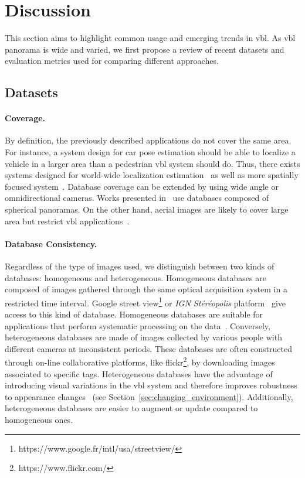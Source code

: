 \section{Discussion}
\label{sec:comparison}
	This section aims to highlight common usage and emerging trends in \ac{vbl}. As \ac{vbl} panorama is wide and varied, we first propose a review of recent datasets and evaluation metrics used for comparing different approaches.
    
	\subsection{Datasets}
		\paragraph{Coverage.}			
		By definition, the previously described applications do not cover the same area. For instance, a system design for car pose estimation should be able to localize a vehicle in a larger area than a pedestrian \ac{vbl} system should do. Thus, there exists systems designed for world-wide localization estimation~\citep{Hays2008,Weyand2016,Vo2017} as well as more spatially focused system~\citep{Song2016}. Database coverage can be extended by using wide angle or omnidirectional cameras. Works presented in~\citep{Arandjelovic2017,Iscen2017,Kumar2016mastersThesis,Ramalingam2010,Torii2011,Zamir2010,Zamir2014} use databases composed of spherical panoramas. On the other hand, aerial images are likely to cover large area but restrict \ac{vbl} applications~\citep{Wan2016}.
		
		\paragraph{Database Consistency.}
		\label{para:data_consistency}
		Regardless of the type of images used, we distinguish between two kinds of databases: homogeneous and heterogeneous. Homogeneous databases are composed of images gathered through the same optical acquisition system in a restricted time interval. Google street view\footnote{https://www.google.fr/intl/usa/streetview/} or \textit{IGN St\'er\'eopolis} platform~\citep{Paparoditis2012} give access to this kind of database. Homogeneous databases are suitable for applications that perform systematic processing on the data~\citep{Majdik2013,Torii2015}. Conversely, heterogeneous databases are made of images collected by various people with different cameras at inconsistent periods. These databases are often constructed through on-line collaborative platforms, like flickr\footnote{https://www.flickr.com/}, by downloading images associated to specific tags. Heterogeneous databases have the advantage of introducing visual variations in the \ac{vbl} system and therefore improves robustness to appearance changes~\citep{Radenovic2016,Gordo2016} (see Section~\ref{sec:changing_environment}). Additionally, heterogeneous databases are easier to augment or update compared to homogeneous ones.

